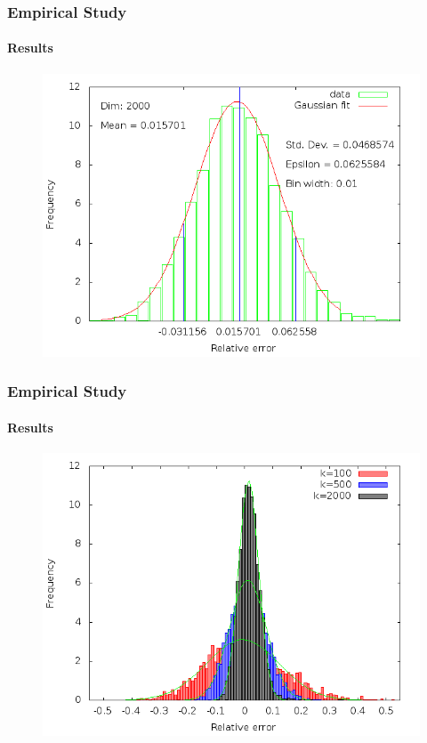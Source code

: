 \documentclass{beamer}
\begin{document}
\begin{frame}
\frametitle{Empirical Study}
\framesubtitle{Results}
  		\begin{figure}
		\includegraphics[scale=0.46]{histogram2000.png}
	\end{figure}
\end{frame}

\begin{frame}
\frametitle{Empirical Study}
\framesubtitle{Results}
  		\begin{figure}
		\includegraphics[scale=0.46]{histogramAll.png}
	\end{figure}
\end{frame} 
\end{document}
